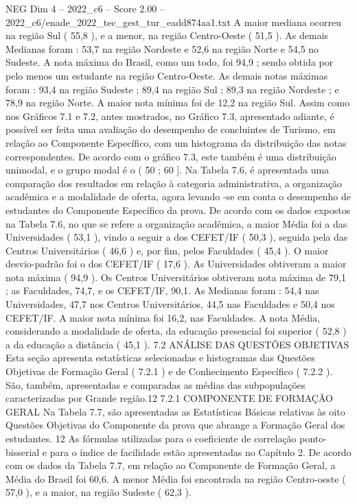 \begin{textsample}{NEG Dim 4 – 2022\_c6 – Score 2.00 – 2022\_c6/enade\_2022\_tec\_gest\_tur\_eadd874aa1.txt}
A maior mediana ocorreu na região Sul ( 55,8 ), e a menor, na região Centro-Oeste ( 51,5 ).
As demais Medianas foram : 53,7 na região Nordeste e 52,6 na região Norte e 54,5 no Sudeste.
A nota máxima do Brasil, como um todo, foi 94,9 ; sendo obtida por pelo menos um estudante na região Centro-Oeste.
As demais notas máximas foram : 93,4 na região Sudeste ; 89,4 na região Sul ; 89,3 na região Nordeste ; e 78,9 na região Norte.
A maior nota mínima foi de 12,2 na região Sul.
Assim como nos Gráficos 7.1 e 7.2, antes mostrados, no Gráfico 7.3, apresentado adiante, é possível ser feita uma avaliação do desempenho de concluintes de Turismo, em relação ao Componente Específico, com um histograma da distribuição das notas correspondentes.
De acordo com o gráfico 7.3, este também é uma distribuição unimodal, e o grupo modal é o ( 50 ; 60 ].
Na Tabela 7.6, é apresentada uma comparação dos resultados em relação à categoria administrativa, a organização acadêmica e a modalidade de oferta, agora levando -se em conta o desempenho de estudantes do Componente Específico da prova.
De acordo com os dados expostos na Tabela 7.6, no que se refere a organização acadêmica, a maior Média foi a das Universidades ( 53,1 ), vindo a seguir a dos CEFET/IF ( 50,3 ), seguida pela das Centros Universitários ( 46,6 ) e, por fim, pelos Faculdades ( 45,4 ).
O maior desvio-padrão foi o dos CEFET/IF ( 17,6 ).
As Universidades obtiveram a maior nota máxima ( 94,9 ).
Os Centros Universitários obtiveram nota máxima de 79,1 ; as Faculdades, 74,7, e os CEFET/IF, 90,1.
As Medianas foram : 54,4 nas Universidades, 47,7 nos Centros Universitários, 44,5 nas Faculdades e 50,4 nos CEFET/IF.
A maior nota mínima foi 16,2, nas Faculdades.
A nota Média, considerando a modalidade de oferta, da educação presencial foi superior ( 52,8 ) a da educação a distância ( 45,1 ). 7.2 ANÁLISE DAS QUESTÕES OBJETIVAS Esta seção apresenta estatísticas selecionadas e histogramas das Questões Objetivas de Formação Geral ( 7.2.1 ) e de Conhecimento Específico ( 7.2.2 ).
São, também, apresentadas e comparadas as médias das subpopulações caracterizadas por Grande região.12 7.2.1 COMPONENTE DE FORMAÇÃO GERAL Na Tabela 7.7, são apresentadas as Estatísticas Básicas relativas às oito Questões Objetivas do Componente da prova que abrange a Formação Geral dos estudantes. 12 As fórmulas utilizadas para o coeficiente de correlação ponto-bisserial e para o índice de facilidade estão apresentadas no Capítulo 2.
De acordo com os dados da Tabela 7.7, em relação ao Componente de Formação Geral, a Média do Brasil foi 60,6.
A menor Média foi encontrada na região Centro-oeste ( 57,0 ), e a maior, na região Sudeste ( 62,3 ).

\end{textsample}

